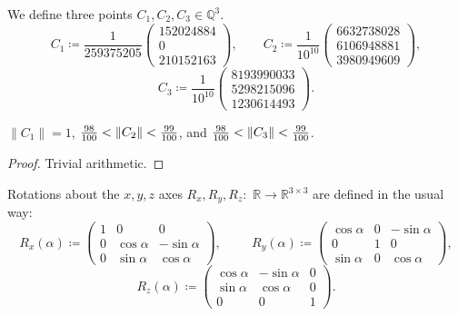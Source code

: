 We define three points $C_1,C_2,C_3\in \mathbb{Q}^3$.
\[
    C_1\coloneqq
        \frac{1}{259375205}
        \begin{pmatrix}
        {152024884} \\ 0 \\ {210152163}
        \end{pmatrix},
\qquad
    C_2\coloneqq \frac{1}{10^{10}}
        \begin{pmatrix}
        6632738028 \\ 6106948881 \\ 3980949609
        \end{pmatrix},
\]
\[
    C_3\coloneqq
        \frac{1}{10^{10}}
        \begin{pmatrix}
        8193990033 \\ 5298215096 \\ 1230614493
        \end{pmatrix}.
\]

\begin{lemma}
\label{c1_c2_c3_norms}
\leanok
$\| C_1 \| = 1$,
${98 \over 100} < \| C_2 \| < {99 \over 100}$, and
${98 \over 100} < \| C_3 \| < {99 \over 100}$.
\end{lemma}
\begin{proof}
\leanok
Trivial arithmetic.
\end{proof}

Rotations about the $x, y, z$ axes $R_x,R_y,R_z:$  $\mathbb{R}\to \mathbb{R}^{3\times 3}$
are defined in the usual way:
    \[
            R_x(\alpha)\coloneqq
        \begin{pmatrix}
            1 & 0 & 0\\
            0 & \cos\alpha & -\sin\alpha\\
            0 & \sin\alpha & \cos\alpha
        \end{pmatrix},
        \hspace{1cm}
        R_y(\alpha)\coloneqq
        \begin{pmatrix}
            \cos\alpha & 0 & -\sin\alpha\\
            0 & 1 & 0\\
            \sin\alpha & 0 & \cos\alpha
        \end{pmatrix},
    \]
    \[
        R_z(\alpha)\coloneqq
        \begin{pmatrix}
            \cos\alpha & -\sin\alpha &0\\
            \sin\alpha & \cos\alpha &0\\
            0 & 0 & 1
        \end{pmatrix}.
    \]

